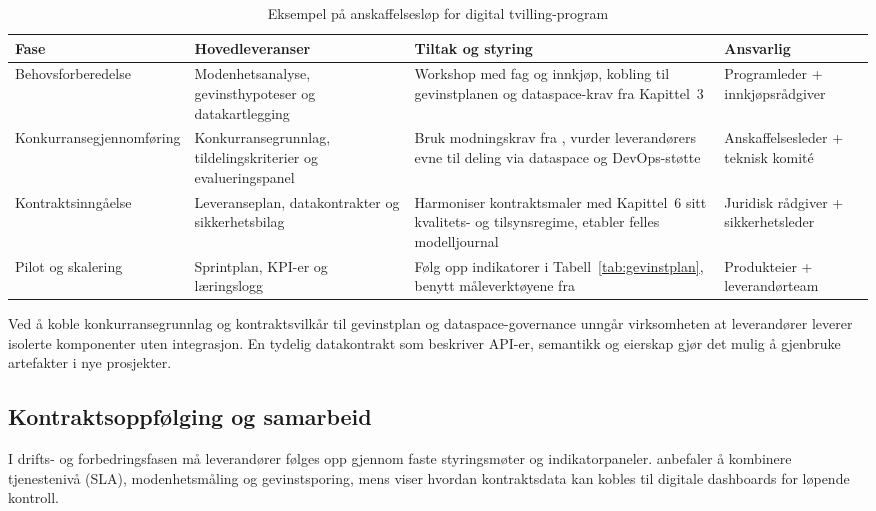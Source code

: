 \begin{table}[h]
    \centering
    \caption{Eksempel på anskaffelsesløp for digital tvilling-program}
    \label{tab:anskaffelseslop}
    \begin{tabular}{|p{3.1cm}|p{4.6cm}|p{4.4cm}|p{3.0cm}|}
        \hline
        \textbf{Fase} & \textbf{Hovedleveranser} & \textbf{Tiltak og styring} & \textbf{Ansvarlig} \\
        \hline
        Behovsforberedelse & Modenhetsanalyse, gevinsthypoteser og datakartlegging & Workshop med fag og innkjøp, kobling til gevinstplanen og dataspace-krav fra Kapittel~3 & Programleder + innkjøpsrådgiver \\
        \hline
        Konkurransegjennomføring & Konkurransegrunnlag, tildelingskriterier og evalueringspanel & Bruk modningskrav fra \citet{dfo2023anskaffelser}, vurder leverandørers evne til deling via dataspace og DevOps-støtte & Anskaffelsesleder + teknisk komité \\
        \hline
        Kontraktsinngåelse & Leveranseplan, datakontrakter og sikkerhetsbilag & Harmoniser kontraktsmaler med Kapittel~6 sitt kvalitets- og tilsynsregime, etabler felles modelljournal & Juridisk rådgiver + sikkerhetsleder \\
        \hline
        Pilot og skalering & Sprintplan, KPI-er og læringslogg & Følg opp indikatorer i Tabell~\ref{tab:gevinstplan}, benytt måleverktøyene fra \citet{dfo2024kontraktsoppfolging} & Produkteier + leverandørteam \\
        \hline
    \end{tabular}
\end{table}

Ved å koble konkurransegrunnlag og kontraktsvilkår til gevinstplan og dataspace-governance unngår virksomheten at leverandører leverer
isolerte komponenter uten integrasjon. En tydelig datakontrakt som beskriver API-er, semantikk og eierskap gjør det mulig å gjenbruke
artefakter i nye prosjekter.\citep{digdir2023modelljournal}

\subsection*{Kontraktsoppfølging og samarbeid}
I drifts- og forbedringsfasen må leverandører følges opp gjennom faste styringsmøter og indikatorpaneler. \citet{ks2023leverandor}
anbefaler å kombinere tjenestenivå (SLA), modenhetsmåling og gevinstsporing, mens \citet{dfo2024kontraktsoppfolging} viser hvordan
kontraktsdata kan kobles til digitale dashboards for løpende kontroll.

